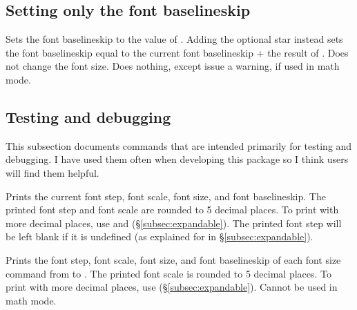 \documentclass{beery}
\begin{document}
\subsection{Setting only the font baselineskip}
\label{subsec:setfontbaselineskip}

\begin{displaycode}
   \sarg{} 
\end{displaycode}

Sets the font baselineskip to the value of .
Adding the optional star \sarg{} instead sets the font baselineskip equal to the current font baselineskip + the result of .
Does not change the font size.
Does nothing, except issue a warning, if used in math mode.

\subsection{Testing and debugging}
\label{subsec:debug}

This subsection documents commands that are intended primarily for testing and debugging.
I have used them often when developing this package so I think users will find them helpful.

\begin{displaycode}
\end{displaycode}

Prints the current font step, font scale, font size, and font baselineskip.
The printed font step and font scale are rounded to \num{5} decimal places.
To print with more decimal places, use  and  (\S\ref{subsec:expandable}).
The printed font step will be left blank if it is undefined (as explained for  in \S\ref{subsec:expandable}).

\begin{displaycode}
\end{displaycode}

Prints the font step, font scale, font size, and font baselineskip of each font size command from  to .
The printed font scale is rounded to \num{5} decimal places.
To print with more decimal places, use  (\S\ref{subsec:expandable}).
Cannot be used in math mode.

\begin{displaycode}
   \sarg{} 
\end{displaycode}
\end{document}
